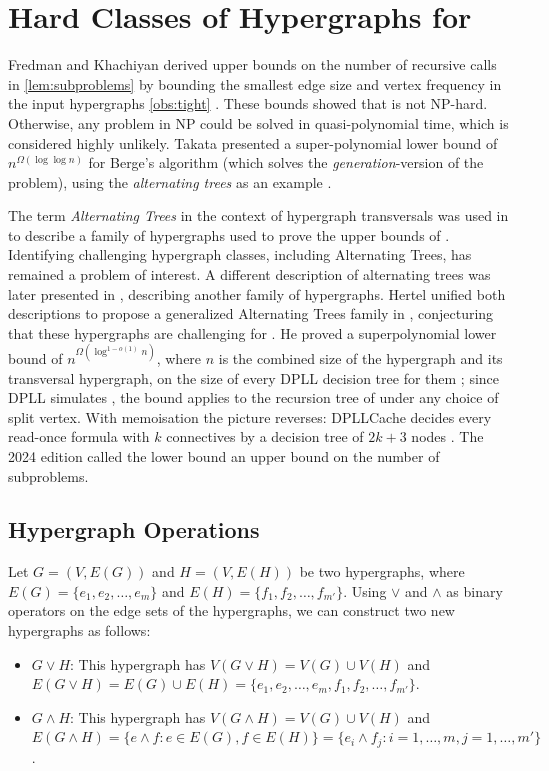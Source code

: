 \chapter{Hard Classes of Hypergraphs for \FKA}

Fredman and Khachiyan derived upper bounds on the number of recursive calls in \ref{lem:subproblems} by bounding the smallest edge size and vertex frequency in the input hypergraphs \ref{obs:tight} \cite{FK96}. These bounds showed that \TransHyp{} is not NP-hard. Otherwise, any problem in NP could be solved in quasi-polynomial time, which is considered highly unlikely. Takata presented a super-polynomial lower bound of $n^{\Omega(\log\log n)}$ for Berge's algorithm (which solves the \emph{generation}-version of the problem), using the \emph{alternating trees} as an example \cite{Tak08}.

The term \emph{Alternating Trees} in the context of hypergraph transversals was used in \cite{GK99} to describe a family of hypergraphs used to prove the upper bounds of \FKA. Identifying challenging hypergraph classes, including Alternating Trees, has remained a problem of interest. A different description of alternating trees was later presented in \cite{Tak08}, describing another family of hypergraphs. Hertel unified both descriptions to propose a generalized Alternating Trees family in \cite{Her04}, conjecturing that these hypergraphs are challenging for \FKA{}. He proved a superpolynomial lower bound of $n^{\Omega(\log^{1-o(1)}n)}$, where $n$ is the combined size of the hypergraph and its transversal hypergraph, on the size of every DPLL decision tree for them \cite[Thm.~4.3.6]{Her04}; since DPLL simulates \FKA{} \cite[Thm.~4.1.7]{Her04}, the bound applies to the recursion tree of \FKA{} under any choice of split vertex. With memoisation the picture reverses: DPLLCache decides every read-once formula with $k$ connectives by a decision tree of $2k+3$ nodes \cite[Thm.~4.4.1]{Her04}. The 2024 edition called the lower bound an upper bound on the number of subproblems.

\section{Hypergraph Operations}

Let $G=(V,E(G))$ and $H=(V,E(H))$ be two hypergraphs, where $E(G)=\{e_1,e_2,\dots,e_m\}$ and $E(H)=\{f_1,f_2,\dots,f_{m'}\}$. Using $\vee$ and $\wedge$ as binary operators on the edge sets of the hypergraphs, we can construct two new hypergraphs as follows:
\begin{itemize}
\item $G\vee H$: This hypergraph has $V(G\vee H)=V(G)\cup V(H)$ and $E(G\vee H)=E(G)\cup E(H)=\{e_1,e_2,\dots,e_m,f_1,f_2,\dots,f_{m'}\}$.
\item $G\wedge H$: This hypergraph has $V(G\wedge H)=V(G)\cup V(H)$ and $E(G\wedge H)=\{e\wedge f:e\in E(G),f\in E(H)\}=\{e_i\wedge f_j:i=1,\dots,m,j=1,\dots,m'\}$.
\end{itemize}

